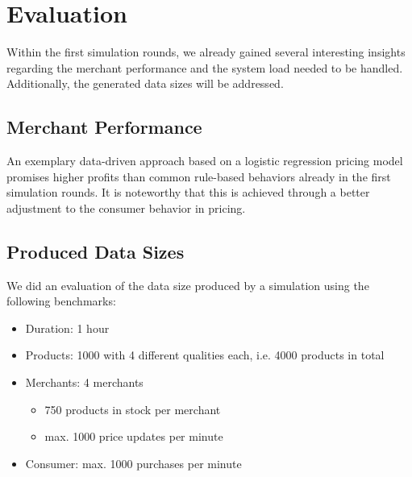 %
\section{Evaluation}
\label{sec:evaluation}
%
Within the first simulation rounds, we already gained several interesting insights regarding the merchant performance and the system load needed to be handled. Additionally, the generated data sizes will be addressed.

\subsection{Merchant Performance}
\label{sec:merchant_evaluation}
%
An exemplary data-driven approach based on a logistic regression pricing model promises higher profits than common rule-based behaviors already in the first simulation rounds. It is noteworthy that this is achieved through a better adjustment to the consumer behavior in pricing.





%
\subsection{Produced Data Sizes}
%

We did an evaluation of the data size produced by a simulation using the following benchmarks:
\begin{itemize}
    \item Duration: 1 hour
    \item Products: 1000 with 4 different qualities each, i.e. 4000 products in total
    \item Merchants: 4 merchants
    \begin{itemize}
        \item 750 products in stock per merchant
        \item max. 1000 price updates per minute
    \end{itemize}
    \item Consumer: max. 1000 purchases per minute
\end{itemize}


